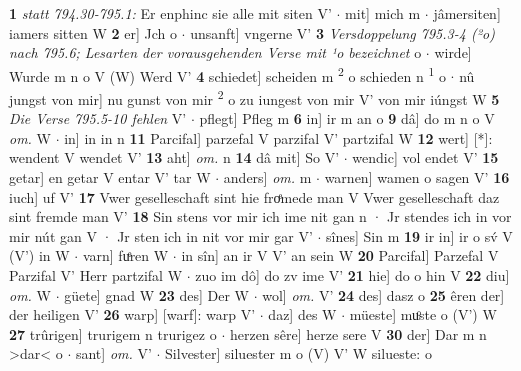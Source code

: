 \documentclass[8pt,a4paper,notitlepage]{article}
\begin{document}
\begin{table}[ht]
\begin{minipage}[t]{0.5\linewidth}
\textbf{1} \textit{statt 794.30-795.1:} Er enphinc sie alle mit siten V'   $\cdot$ mit] mich m  $\cdot$ jâmersiten] iamers sitten W \textbf{2} er] Jch o  $\cdot$ unsanft] vngerne V' \textbf{3} \textit{Versdoppelung 795.3-4 (²o) nach 795.6; Lesarten der vorausgehenden Verse mit ¹o bezeichnet} o   $\cdot$ wirde] Wurde m n o V (W) Werd V' \textbf{4} schiedet] scheiden m \textsuperscript{2}\hspace{-1.3mm} o schieden n \textsuperscript{1}\hspace{-1.3mm} o  $\cdot$ nû jungst von mir] nu gunst von mir \textsuperscript{2}\hspace{-1.3mm} o zu iungest von mir V' von mir iúngst W \textbf{5} \textit{Die Verse 795.5-10 fehlen} V'   $\cdot$ pflegt] Pfleg m \textbf{6} in] ir m an o \textbf{9} dâ] do m n o V \textit{om.} W  $\cdot$ in] in in n \textbf{11} Parcifal] parzefal V parzifal V' partzifal W \textbf{12} wert] [*]: wendent V wendet V' \textbf{13} aht] \textit{om.} n \textbf{14} dâ mit] So V'  $\cdot$ wendic] vol endet V' \textbf{15} getar] en getar V entar V' tar W  $\cdot$ anders] \textit{om.} m  $\cdot$ warnen] wamen o sagen V' \textbf{16} iuch] uf V' \textbf{17} Vwer geselleschaft sint hie froͤmede man V Vwer geselleschaft daz sint fremde man V' \textbf{18} Sin stens vor mir ich ime nit gan n · Jr stendes ich in vor mir nút gan V · Jr sten ich in nit vor mir gar V'  $\cdot$ sînes] Sin m \textbf{19} ir in] ir o sv́ V (V') in W  $\cdot$ varn] fuͤren W  $\cdot$ in sîn] an ir V V' an sein W \textbf{20} Parcifal] Parzefal V Parzifal V' Herr partzifal W  $\cdot$ zuo im dô] do zv ime V' \textbf{21} hie] do o hin V \textbf{22} diu] \textit{om.} W  $\cdot$ güete] gnad W \textbf{23} des] Der W  $\cdot$ wol] \textit{om.} V' \textbf{24} des] dasz o \textbf{25} êren der] der heiligen V' \textbf{26} warp] [warf]: warp V'  $\cdot$ daz] des W  $\cdot$ müeste] muͦste o (V') W \textbf{27} trûrigen] trurigem n trurigez o  $\cdot$ herzen sêre] herze sere V \textbf{30} der] Dar m n >dar< o  $\cdot$ sant] \textit{om.} V'  $\cdot$ Silvester] siluester m o (V) V' W silueste: o \newline
\end{minipage}
\end{table}
\newpage
\end{document}
